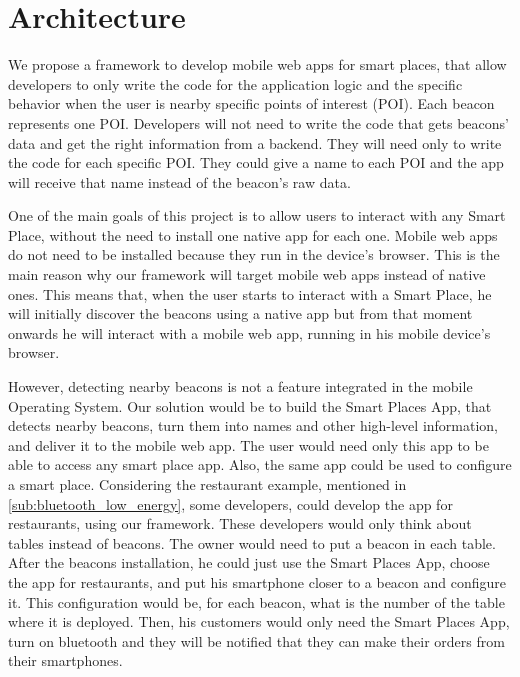 
% 
% 

\section{Architecture}
\label{sec:architecture}
We propose a framework to develop mobile web apps for smart
places, that allow developers to only write the code
for the application logic and the specific behavior when
the user is nearby specific points of interest (POI).
Each beacon represents one POI. Developers will not need
to write the code that gets beacons' data and get the
right information from a backend. They will need only
to write the code for each specific POI. They could give
a name to each POI and the app will receive that name 
instead of the beacon's raw data. 

One of the main goals of this project is to allow
users to interact with any Smart Place, without
the need to install one native app for each one.
Mobile web apps do not need to be installed because
they run in the device's browser.
This is the main reason why our framework will
target mobile web apps instead of native ones.
This means that, when the user starts to interact
with a Smart Place, he will initially discover the
beacons using a native app but from that moment
onwards
he will interact with a mobile
web app, running in his mobile device's browser.

However, detecting
nearby beacons is not a feature integrated in the mobile
Operating System. Our solution would be to build the
Smart Places App,
that detects nearby beacons, turn them into names and
other high-level information, and deliver it to the
mobile web app. The user would need only this app to
be able to access any smart place app. Also, the same app
could be used to configure a smart place.
Considering the restaurant example, mentioned in
\ref{sub:bluetooth_low_energy}, some
developers, could develop the app for restaurants,
using our framework. These developers would only think
about tables instead of beacons. The owner would need
to put a beacon in each table. After the beacons
installation, he could just use the Smart Places App,
choose the app for restaurants, and put his smartphone
closer to a beacon and configure it. This configuration
would be, for each beacon, what is the number of the table
where it is deployed. Then, his customers would only
need the Smart Places App, turn on bluetooth and they will
be notified that they can make their orders from their
smartphones.

